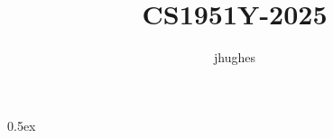 \documentclass[11pt,a4paper]{article}
\begin{document}
\title{CS1951Y-2025}
\author{jhughes}
\maketitle

\tableofcontents

\parindent 0pt\parskip 0.5ex



%
%
\end{document}
